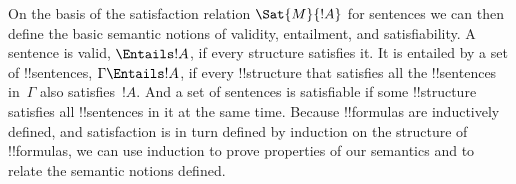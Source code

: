 \documentclass[../../../include/open-logic-section]{subfiles}
\begin{document}
On the basis of the satisfaction relation $\Sat{M}{!A}$ for sentences
we can then define the basic semantic notions of validity, entailment,
and satisfiability.  A sentence is valid, $\Entails !A$, if every
structure satisfies it. It is entailed by a set of !!{sentence}s,
$\Gamma \Entails !A$, if every !!{structure} that satisfies all the
!!{sentence}s in~$\Gamma$ also satisfies~$!A$. And a set of sentences
is satisfiable if some !!{structure} satisfies all !!{sentence}s in it
at the same time.  Because !!{formula}s are inductively defined, and
satisfaction is in turn defined by induction on the structure of
!!{formula}s, we can use induction to prove properties of our
semantics and to relate the semantic notions defined.
\end{document}

